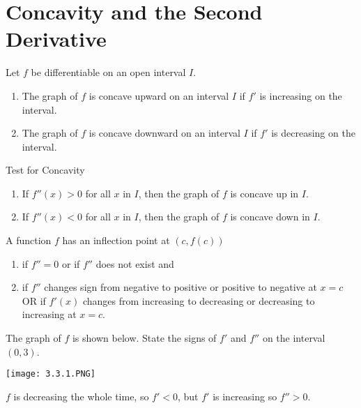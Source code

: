 \documentclass[../bccalc.tex]{subfiles}
\begin{document}
\section{Concavity and the Second Derivative}
\begin{definition}[Concavity]
    Let $f$ be differentiable on an open interval $I$.

    \begin{enumerate}
        \item The graph of $f$ is concave upward on an interval $I$ if $f'$ is increasing on the interval.
        \item The graph of $f$ is concave downward on an interval $I$ if $f'$ is decreasing on the interval.
    \end{enumerate}
\end{definition}

Test for Concavity
\begin{enumerate}
    \item If $f''(x)>0$ for all $x$ in $I$, then the graph of $f$ is concave up in $I$.
    \item If $f''(x)<0$ for all $x$ in $I$, then the graph of $f$ is concave down in $I$.
\end{enumerate}

\begin{definition}
    A function $f$ has an inflection point at $(c,f(c))$

    \begin{enumerate}
        \item if $f''=0$ or if $f''$ does not exist and 
        \item if $f''$ changes sign from negative to positive or positive to negative at $x=c$ OR if $f'(x)$ changes from increasing to decreasing or decreasing to increasing at $x=c$.
    \end{enumerate}
\end{definition}

\begin{example}
    The graph of $f$ is shown below. State the signs of $f'$ and $f''$ on the interval $(0,3)$.
    \begin{center}
        \texttt{[image: 3.3.1.PNG]}
    \end{center}

    $f$ is decreasing the whole time, so $f'<0$, but $f'$ is increasing so $f''>0$.
\end{example}
\end{document}

